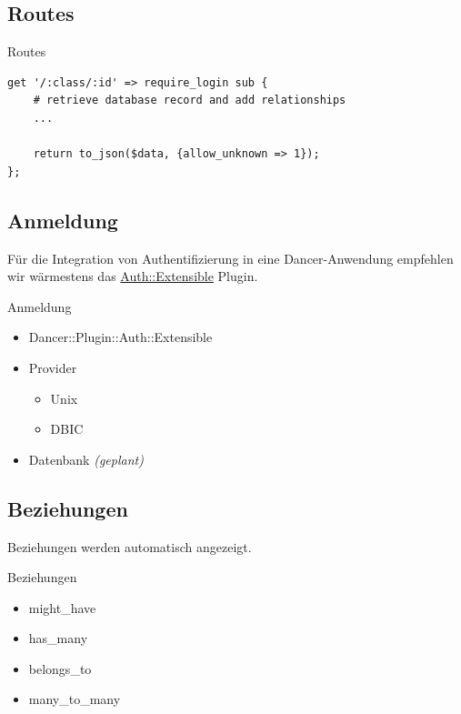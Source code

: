 \subsection{Routes}
\begin{frame}[fragile]{Routes}
\begin{lstlisting}
get '/:class/:id' => require_login sub {
    # retrieve database record and add relationships
    ...

    return to_json($data, {allow_unknown => 1});
};
\end{lstlisting}
\end{frame}

\subsection{Anmeldung}

Für die Integration von Authentifizierung in eine Dancer-Anwendung empfehlen
wir wärmestens das
\href{https://metacpan.org/pod/Dancer::Plugin::Auth::Extensible}{Auth::Extensible}
Plugin.

\begin{frame}{Anmeldung}
\begin{itemize}
\item Dancer::Plugin::Auth::Extensible
\item Provider
\begin{itemize}
\item Unix
\item DBIC
\end{itemize}
\item Datenbank \textit{(geplant)}
\end{itemize}
\end{frame}

\subsection{Beziehungen}

Beziehungen werden automatisch angezeigt.

\begin{frame}{Beziehungen}
\begin{itemize}
\item might\_have
\item has\_many
\item belongs\_to
\item many\_to\_many
\end{itemize}
\end{frame}

